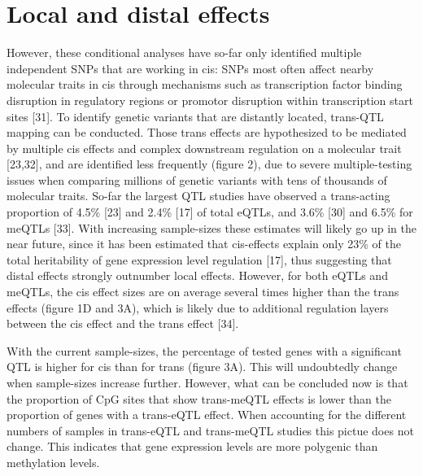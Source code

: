 \section{Local and distal effects}
However, these conditional analyses have so-far only identified multiple independent SNPs that are working in cis: SNPs most often affect nearby molecular traits in cis through mechanisms such as transcription factor binding disruption in regulatory regions or promotor disruption within transcription start sites [31]. To identify genetic variants that are distantly located, trans-QTL mapping can be conducted. Those trans effects are hypothesized to be mediated by multiple cis effects and complex downstream regulation on a molecular trait [23,32], and are identified less frequently (figure 2), due to severe multiple-testing issues when comparing millions of genetic variants with tens of thousands of molecular traits. So-far the largest QTL studies have observed a trans-acting proportion of 4.5\% [23] and 2.4\% [17] of total eQTLs, and 3.6\% [30] and 6.5\% for meQTLs [33]. With increasing sample-sizes these estimates will likely go up in the near future, since it has been estimated that cis-effects explain only 23\% of the total heritability of gene expression level regulation [17], thus suggesting that distal effects strongly outnumber local effects. However, for both eQTLs and meQTLs, the cis effect sizes are on average several times higher than the trans effects (figure 1D and 3A), which is likely due to additional regulation layers between the cis effect and the trans effect [34]. 

With the current sample-sizes, the percentage of tested genes with a significant QTL is higher for cis than for trans (figure 3A). This will undoubtedly change when sample-sizes increase further. However, what can be concluded now is that the proportion of CpG sites that show trans-meQTL effects is lower than the proportion of genes with a trans-eQTL effect. When accounting for the different numbers of samples in trans-eQTL and trans-meQTL studies this pictue does not change. This indicates that gene expression levels are more polygenic than methylation levels. 

